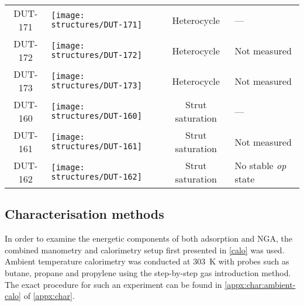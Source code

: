 \begin{table}[p]
\begin{tabular}{c >{\centering}m{6cm} c p{4cm}}
            DUT-171  & 
            \texttt{[image: structures/DUT-171]}
            & Heterocycle & --- \\
            DUT-172  & 
            \texttt{[image: structures/DUT-172]}
            & Heterocycle & Not measured \\
            DUT-173  & 
            \texttt{[image: structures/DUT-173]}
            & Heterocycle & Not measured \\
        \midrule
        DUT-160  & 
            \texttt{[image: structures/DUT-160]}
            & Strut saturation & --- \\
        DUT-161  & 
            \texttt{[image: structures/DUT-161]}
            & Strut saturation & Not measured \\
        DUT-162  & 
            \texttt{[image: structures/DUT-162]}
            & Strut saturation & No stable \textit{op} state \\
        \bottomrule
	\end{tabular}%
	\label{dut:tab:materials}
\end{table}%

\subsection{Characterisation methods}

In order to examine the energetic components of both adsorption and 
NGA, the combined manometry and calorimetry setup first 
presented in \autoref{calo} was used. Ambient temperature calorimetry
was conducted at \SI{303}{\kelvin} with probes such as butane, propane
and propylene using the step-by-step gas introduction method. 
The exact procedure for such an experiment can be found in 
\autoref{appx:char:ambient-calo} of \autoref{appx:char}.

